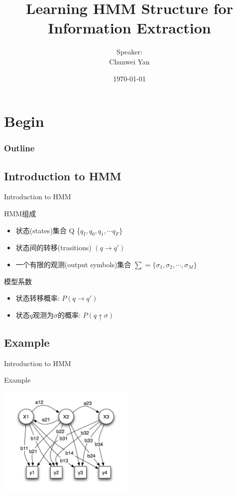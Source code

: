 \documentclass{beamer}
\title{Learning HMM Structure for Information Extraction}
\author{Speaker:\\Chunwei Yan}
\institute[PKUSZ]{
    互联网研发中心
}
\date{\today}
\begin{document}
\begin{frame}
  \titlepage
\end{frame}

\section{Begin}
\begin{frame}
\frametitle{Outline}
\tableofcontents
\end{frame}

\subsection{Introduction to HMM}
\begin{frame}{Introduction to HMM}
            \pause
\begin{block}{HMM组成 }
    \begin{itemize}
        \item 状态(states)集合 Q \{$q_I, q_0, q_1, \cdots q_F$\}
        \item 状态间的转移(trasitions) $(q \rightarrow q')$
        \item 一个有限的观测(output symbols)集合 $\sum = \{ \sigma_1, \sigma_2, \cdots, \sigma_M\}$
    \end{itemize}
\end{block}

\pause
\begin{block}{模型系数}
\begin{itemize}
    \item 状态转移概率: $P(q \rightarrow q')$
    \item 状态$q$观测为$\sigma$的概率: $P(q \uparrow \sigma)$ 
\end{itemize}
\end{block}
\end{frame}

\subsection{Example}
\begin{frame}{Introduction to HMM}
\begin{block}{Example}
\begin{center}
    \includegraphics[height=150pt]{report5/hmm.png}
\end{center}
\end{block}
\end{frame}
\end{document}
